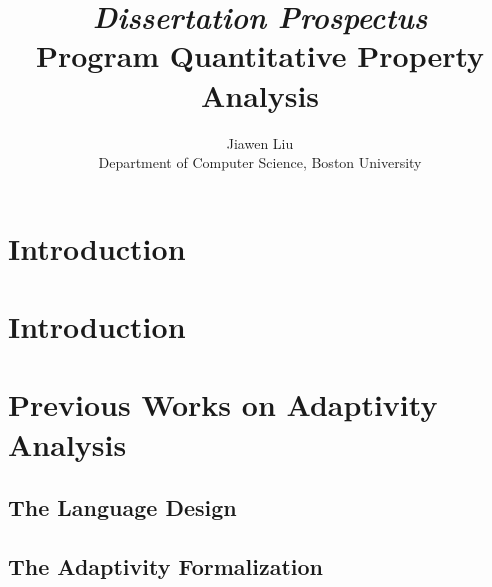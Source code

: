 \documentclass[a4paper,11pt]{article}
\begin{document}
\title{{\em Dissertation Prospectus}
\\ {Program Quantitative Property Analysis}
}

\author{Jiawen Liu\\ Department of Computer Science, Boston University}
\maketitle
\begin{abstract}

\end{abstract}

\clearpage
\tableofcontents{}

\clearpage
\section{Introduction}
\label{sec:introduction}


\section*{ }
%

\section{Introduction }
\label{sec:adapt-intro}


\section{Previous Works on Adaptivity Analysis }
\label{sec:prework}

\subsection{The Language Design}
\label{sec:prework-language}

%
\subsection{The Adaptivity Formalization}
\label{sec:prework-formalization}

%
\end{document}
